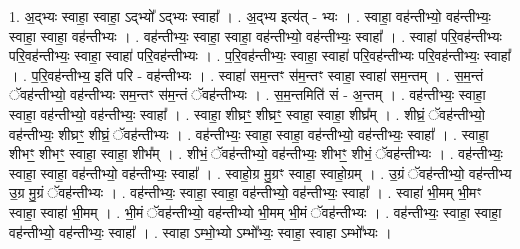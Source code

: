 \documentclass[17pt]{extarticle}
\begin{document}
1. अ॒द्भ्यः स्वाहा॒ स्वाहा॒ ऽद्भ्यो᳚ ऽद्भ्यः स्वाहा᳚ । . अ॒द्भ्य इत्य॑त् - भ्यः । . स्वाहा॒ वह॑न्तीभ्यो॒ वह॑न्तीभ्यः॒ स्वाहा॒ स्वाहा॒ वह॑न्तीभ्यः । . वह॑न्तीभ्यः॒ स्वाहा॒ स्वाहा॒ वह॑न्तीभ्यो॒ वह॑न्तीभ्यः॒ स्वाहा᳚ । . स्वाहा॑ परि॒वह॑न्तीभ्यः परि॒वह॑न्तीभ्यः॒ स्वाहा॒ स्वाहा॑ परि॒वह॑न्तीभ्यः । . प॒रि॒वह॑न्तीभ्यः॒ स्वाहा॒ स्वाहा॑ परि॒वह॑न्तीभ्यः परि॒वह॑न्तीभ्यः॒ स्वाहा᳚ । . प॒रि॒वह॑न्तीभ्य॒ इति॑ परि - वह॑न्तीभ्यः । . स्वाहा॑ सम॒न्तꣳ स॑म॒न्तꣳ स्वाहा॒ स्वाहा॑ सम॒न्तम् । . स॒म॒न्तं ॅवह॑न्तीभ्यो॒ वह॑न्तीभ्यः सम॒न्तꣳ स॑म॒न्तं ॅवह॑न्तीभ्यः । . स॒म॒न्तमिति॑ सं - अ॒न्तम् । . वह॑न्तीभ्यः॒ स्वाहा॒ स्वाहा॒ वह॑न्तीभ्यो॒ वह॑न्तीभ्यः॒ स्वाहा᳚ । . स्वाहा॒ शीघ्रꣳ॒॒ शीघ्रꣳ॒॒ स्वाहा॒ स्वाहा॒ शीघ्र᳚म् । . शीघ्रं॒ ॅवह॑न्तीभ्यो॒ वह॑न्तीभ्यः॒ शीघ्रꣳ॒॒ शीघ्रं॒ ॅवह॑न्तीभ्यः । . वह॑न्तीभ्यः॒ स्वाहा॒ स्वाहा॒ वह॑न्तीभ्यो॒ वह॑न्तीभ्यः॒ स्वाहा᳚ । . स्वाहा॒ शीभꣳ॒॒ शीभꣳ॒॒ स्वाहा॒ स्वाहा॒ शीभ᳚म् । . शीभं॒ ॅवह॑न्तीभ्यो॒ वह॑न्तीभ्यः॒ शीभꣳ॒॒ शीभं॒ ॅवह॑न्तीभ्यः । . वह॑न्तीभ्यः॒ स्वाहा॒ स्वाहा॒ वह॑न्तीभ्यो॒ वह॑न्तीभ्यः॒ स्वाहा᳚ । . स्वाहो॒ग्र मु॒ग्रꣳ स्वाहा॒ स्वाहो॒ग्रम् । . उ॒ग्रं ॅवह॑न्तीभ्यो॒ वह॑न्तीभ्य उ॒ग्र मु॒ग्रं ॅवह॑न्तीभ्यः । . वह॑न्तीभ्यः॒ स्वाहा॒ स्वाहा॒ वह॑न्तीभ्यो॒ वह॑न्तीभ्यः॒ स्वाहा᳚ । . स्वाहा॑ भी॒मम् भी॒मꣳ स्वाहा॒ स्वाहा॑ भी॒मम् । . भी॒मं ॅवह॑न्तीभ्यो॒ वह॑न्तीभ्यो भी॒मम् भी॒मं ॅवह॑न्तीभ्यः । . वह॑न्तीभ्यः॒ स्वाहा॒ स्वाहा॒ वह॑न्तीभ्यो॒ वह॑न्तीभ्यः॒ स्वाहा᳚ । . स्वाहा ऽम्भो॒भ्यो ऽम्भो᳚भ्यः॒ स्वाहा॒ स्वाहा ऽम्भो᳚भ्यः । \newline
\end{document}
